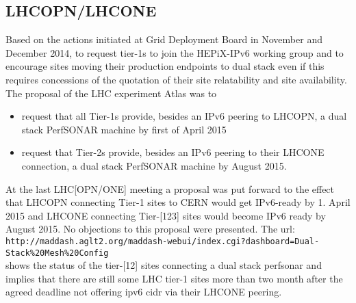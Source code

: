 \subsection{LHCOPN/LHCONE}
Based on the actions initiated at Grid Deployment Board in November and December 2014, to request tier-1s to join the HEPiX-IPv6 working group and to encourage sites moving their production endpoints to dual stack even if this requires concessions of the quotation of their site relatability and site availability. The proposal of the LHC experiment Atlas was to
\begin{itemize}
 \item request that all Tier-1s provide,
	besides an IPv6 peering to LHCOPN,
        a dual stack PerfSONAR machine by first of April 2015
 \item request that Tier-2s provide,
        besides an IPv6 peering to their LHCONE connection,
        a dual stack PerfSONAR machine by August 2015.
\end{itemize}
At the last LHC[OPN/ONE] meeting a proposal was put forward to the effect that
LHCOPN connecting Tier-1 sites to CERN would get IPv6-ready by 1. April 2015 and
LHCONE connecting Tier-[123] sites would become IPv6 ready by August 2015.
No objections to this proposal were presented. The url:\\
{\tt\small http://maddash.aglt2.org/maddash-webui/index.cgi?dashboard=Dual-Stack\%20Mesh\%20Config}\\ shows the status of the tier-[12] sites connecting a dual stack perfsonar and implies that there are still some LHC tier-1 sites more than two month after the agreed deadline not offering ipv6 cidr via their LHCONE peering.
